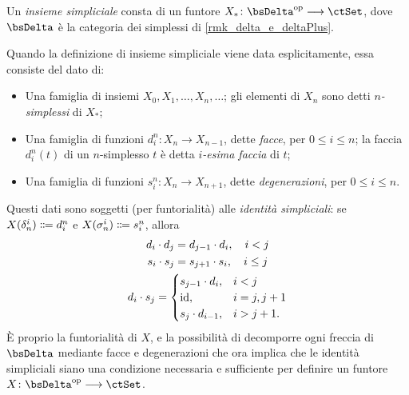 \begin{definition}\label{def_insieme_simpliciale}
 Un \emph{insieme simpliciale} consta di un funtore \(X_* \colon \bsDelta^\op\fun\ctSet\), dove \(\bsDelta\) è la categoria dei simplessi di \ref{rmk_delta_e_deltaPlus}.

 Quando la definizione di insieme simpliciale viene data esplicitamente, essa consiste del dato di:
 \begin{itemize}
  \item Una famiglia di insiemi \(X_0,X_1,\dots,X_n,\dots\); gli elementi di \(X_n\) sono detti	\emph{\(n\)-simplessi} di \(X_*\);
  \item Una famiglia di funzioni \(d_i^n \colon X_n\to X_{n-1}\), dette \emph{facce}, per \(0\leq i\leq n\); la faccia \(d_i^n(t)\) di un \(n\)-simplesso \(t\) è detta \emph{\(i\)-esima faccia} di \(t\);
  \item Una famiglia di funzioni \(s_i^n \colon X_n\to X_{n+1}\), dette \emph{degenerazioni}, per \(0\leq i\leq n\).
 \end{itemize}
 Questi dati sono soggetti (per funtorialità) alle \emph{identità simpliciali}: se \(X(\delta_n^i) \defeq  d_i^n\) e \(X(\sigma_n^i) \defeq  s_i^n\), allora
 \begin{gather}
  d_i\cdot d_j = d_{j-1}\cdot d_i, \quad i < j\label{idsim_1}\\
  s_i \cdot s_j = s_{j+1} \cdot s_i, \quad i \leq j\label{idsim_2}\\
  d_i\cdot s_j =
  \begin{cases}
   s_{j-1}\cdot d_i, & i < j      \\
   \mathrm{id},             & i = j, j+1 \\
   s_j\cdot d_{i-1}, & i > j+1.
  \end{cases}\label{idsim_3}
 \end{gather}
 È proprio la funtorialità di \(X\), e la possibilità di decomporre ogni freccia di \(\bsDelta\) mediante facce e degenerazioni che ora implica che le identità simpliciali siano una condizione necessaria e sufficiente per definire un funtore \(X \colon \bsDelta^\op\fun\ctSet\).
\end{definition}
